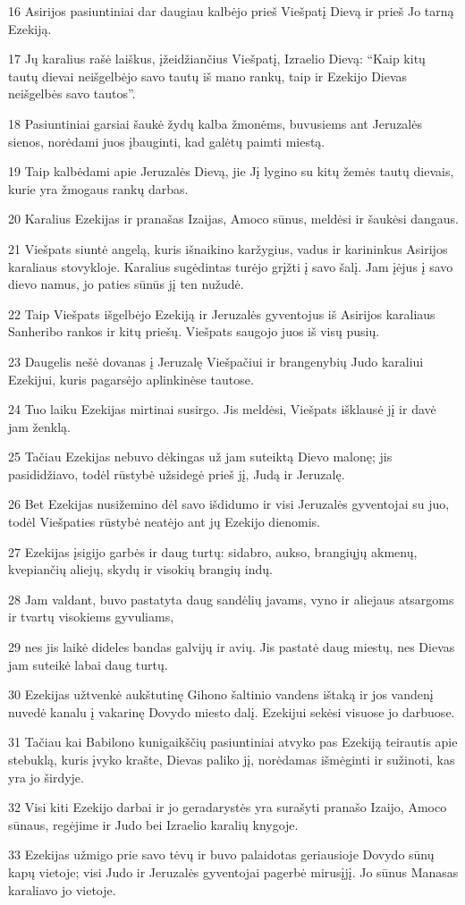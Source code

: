\par 16 Asirijos pasiuntiniai dar daugiau kalbėjo prieš Viešpatį Dievą ir prieš Jo tarną Ezekiją. 
\par 17 Jų karalius rašė laiškus, įžeidžiančius Viešpatį, Izraelio Dievą: “Kaip kitų tautų dievai neišgelbėjo savo tautų iš mano rankų, taip ir Ezekijo Dievas neišgelbės savo tautos”. 
\par 18 Pasiuntiniai garsiai šaukė žydų kalba žmonėms, buvusiems ant Jeruzalės sienos, norėdami juos įbauginti, kad galėtų paimti miestą. 
\par 19 Taip kalbėdami apie Jeruzalės Dievą, jie Jį lygino su kitų žemės tautų dievais, kurie yra žmogaus rankų darbas. 
\par 20 Karalius Ezekijas ir pranašas Izaijas, Amoco sūnus, meldėsi ir šaukėsi dangaus. 
\par 21 Viešpats siuntė angelą, kuris išnaikino karžygius, vadus ir karininkus Asirijos karaliaus stovykloje. Karalius sugėdintas turėjo grįžti į savo šalį. Jam įėjus į savo dievo namus, jo paties sūnūs jį ten nužudė. 
\par 22 Taip Viešpats išgelbėjo Ezekiją ir Jeruzalės gyventojus iš Asirijos karaliaus Sanheribo rankos ir kitų priešų. Viešpats saugojo juos iš visų pusių. 
\par 23 Daugelis nešė dovanas į Jeruzalę Viešpačiui ir brangenybių Judo karaliui Ezekijui, kuris pagarsėjo aplinkinėse tautose. 
\par 24 Tuo laiku Ezekijas mirtinai susirgo. Jis meldėsi, Viešpats išklausė jį ir davė jam ženklą. 
\par 25 Tačiau Ezekijas nebuvo dėkingas už jam suteiktą Dievo malonę; jis pasididžiavo, todėl rūstybė užsidegė prieš jį, Judą ir Jeruzalę. 
\par 26 Bet Ezekijas nusižemino dėl savo išdidumo ir visi Jeruzalės gyventojai su juo, todėl Viešpaties rūstybė neatėjo ant jų Ezekijo dienomis. 
\par 27 Ezekijas įsigijo garbės ir daug turtų: sidabro, aukso, brangiųjų akmenų, kvepiančių aliejų, skydų ir visokių brangių indų. 
\par 28 Jam valdant, buvo pastatyta daug sandėlių javams, vyno ir aliejaus atsargoms ir tvartų visokiems gyvuliams, 
\par 29 nes jis laikė dideles bandas galvijų ir avių. Jis pastatė daug miestų, nes Dievas jam suteikė labai daug turtų. 
\par 30 Ezekijas užtvenkė aukštutinę Gihono šaltinio vandens ištaką ir jos vandenį nuvedė kanalu į vakarinę Dovydo miesto dalį. Ezekijui sekėsi visuose jo darbuose. 
\par 31 Tačiau kai Babilono kunigaikščių pasiuntiniai atvyko pas Ezekiją teirautis apie stebuklą, kuris įvyko krašte, Dievas paliko jį, norėdamas išmėginti ir sužinoti, kas yra jo širdyje. 
\par 32 Visi kiti Ezekijo darbai ir jo geradarystės yra surašyti pranašo Izaijo, Amoco sūnaus, regėjime ir Judo bei Izraelio karalių knygoje. 
\par 33 Ezekijas užmigo prie savo tėvų ir buvo palaidotas geriausioje Dovydo sūnų kapų vietoje; visi Judo ir Jeruzalės gyventojai pagerbė mirusįjį. Jo sūnus Manasas karaliavo jo vietoje.



